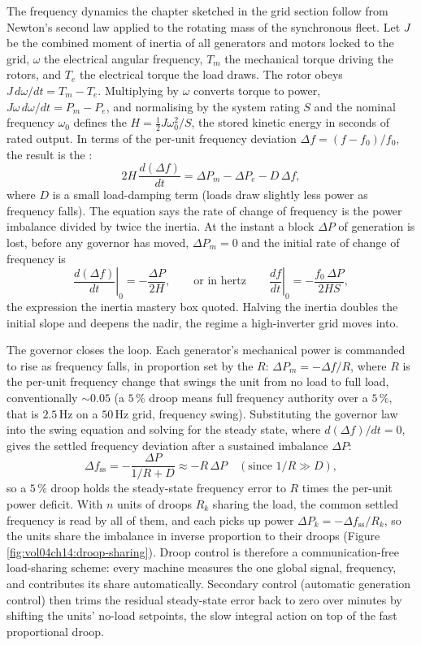 The frequency dynamics the chapter sketched in the grid section follow from
Newton's second law applied to the rotating mass of the synchronous fleet.
Let $J$ be the combined moment of inertia of all generators and motors locked
to the grid, $\omega$ the electrical angular frequency, $T_m$ the mechanical
torque driving the rotors, and $T_e$ the electrical torque the load draws.
The rotor obeys $J\,d\omega/dt = T_m - T_e$. Multiplying by $\omega$ converts
torque to power, $J\omega\,d\omega/dt = P_m - P_e$, and normalising by the
system rating $S$ and the nominal frequency $\omega_0$ defines the
 $H = \tfrac12 J\omega_0^2 / S$, the stored kinetic
energy in seconds of rated output. In terms of the per-unit frequency
deviation $\Delta f = (f - f_0)/f_0$, the result is the :
\[
2H\,\frac{d(\Delta f)}{dt} = \Delta P_m - \Delta P_e - D\,\Delta f,
\]
where $D$ is a small load-damping term (loads draw slightly less power as
frequency falls). The equation says the rate of change of frequency is the
power imbalance divided by twice the inertia. At the instant a block $\Delta
P$ of generation is lost, before any governor has moved, $\Delta P_m = 0$ and
the initial rate of change of frequency is
\[
\left.\frac{d(\Delta f)}{dt}\right|_{0} = -\frac{\Delta P}{2H},
\qquad\text{or in hertz}\qquad
\left.\frac{df}{dt}\right|_{0} = -\frac{f_0\,\Delta P}{2H S},
\]
the expression the inertia mastery box quoted. Halving the inertia doubles the
initial slope and deepens the nadir, the regime a high-inverter grid moves
into.

The governor closes the loop. Each generator's mechanical power is commanded
to rise as frequency falls, in proportion set by the  $R$:
$\Delta P_m = -\Delta f / R$, where $R$ is the per-unit frequency change that
swings the unit from no load to full load, conventionally $\sim 0.05$ (a
$5\,\%$ droop means full frequency authority over a $5\,\%$, that is $2.5\,
\si{\hertz}$ on a $50\,\si{\hertz}$ grid, frequency swing). Substituting the
governor law into the swing equation and solving for the steady state, where
$d(\Delta f)/dt = 0$, gives the settled frequency deviation after a sustained
imbalance $\Delta P$:
\[
\Delta f_{\text{ss}} = -\frac{\Delta P}{1/R + D} \approx -R\,\Delta P
\quad(\text{since } 1/R \gg D),
\]
so a $5\,\%$ droop holds the steady-state frequency error to $R$ times the
per-unit power deficit. With $n$ units of droops $R_k$ sharing the load, the
common settled frequency is read by all of them, and each picks up power
$\Delta P_k = -\Delta f_{\text{ss}}/R_k$, so the units share the imbalance in
inverse proportion to their droops (Figure
\ref{fig:vol04ch14:droop-sharing}). Droop control is therefore a
communication-free load-sharing scheme: every machine measures the one global
signal, frequency, and contributes its share automatically. Secondary control
(automatic generation control) then trims the residual steady-state error back
to zero over minutes by shifting the units' no-load setpoints, the slow
integral action on top of the fast proportional droop.


